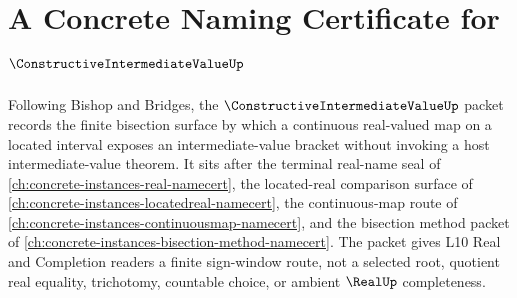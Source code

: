 \chapter{A Concrete Naming Certificate for $\ConstructiveIntermediateValueUp$}
\label{ch:concrete-instances-constructive-intermediate-value-namecert}

Following Bishop and Bridges, the $\ConstructiveIntermediateValueUp$ packet records the finite bisection surface by which a continuous real-valued map on a located interval exposes an intermediate-value bracket without invoking a host intermediate-value theorem. It sits after the terminal real-name seal of \autoref{ch:concrete-instances-real-namecert}, the located-real comparison surface of \autoref{ch:concrete-instances-locatedreal-namecert}, the continuous-map route of \autoref{ch:concrete-instances-continuousmap-namecert}, and the bisection method packet of \autoref{ch:concrete-instances-bisection-method-namecert}. The packet gives L10 Real and Completion readers a finite sign-window route, not a selected root, quotient real equality, trichotomy, countable choice, or ambient $\RealUp$ completeness.

